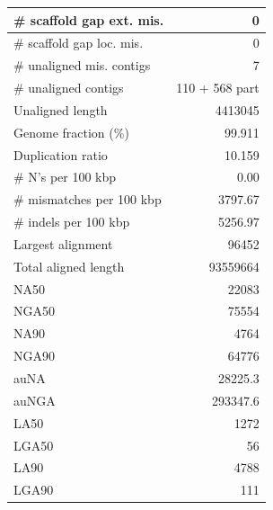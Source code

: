\documentclass[12pt,a4paper]{article}
\begin{document}
\begin{table}[ht]
\begin{center}
\begin{tabular}{|l*{1}{|r}|}
\# scaffold gap ext. mis. & 0 \\ \hline
\# scaffold gap loc. mis. & 0 \\ \hline
\# unaligned mis. contigs & 7 \\ \hline
\# unaligned contigs & 110 + 568 part \\ \hline
Unaligned length & 4413045 \\ \hline
Genome fraction (\%) & 99.911 \\ \hline
Duplication ratio & 10.159 \\ \hline
\# N's per 100 kbp & 0.00 \\ \hline
\# mismatches per 100 kbp & 3797.67 \\ \hline
\# indels per 100 kbp & 5256.97 \\ \hline
Largest alignment & 96452 \\ \hline
Total aligned length & 93559664 \\ \hline
NA50 & 22083 \\ \hline
NGA50 & 75554 \\ \hline
NA90 & 4764 \\ \hline
NGA90 & 64776 \\ \hline
auNA & 28225.3 \\ \hline
auNGA & 293347.6 \\ \hline
LA50 & 1272 \\ \hline
LGA50 & 56 \\ \hline
LA90 & 4788 \\ \hline
LGA90 & 111 \\ \hline
\end{tabular}
\end{center}
\end{table}
\end{document}
